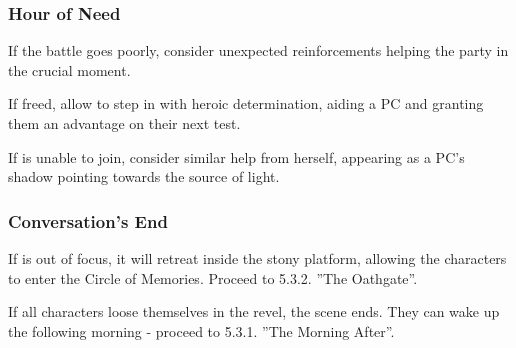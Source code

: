 \subsubsection{Hour of Need}

If the battle goes poorly, consider unexpected reinforcements helping the party in the crucial moment. 

If freed, allow \npcRevelerGeneral{} to step in with heroic determination, aiding a PC and granting them an advantage on their next test.

If \npcRevelerGeneral{} is unable to join, consider similar help from \npcSjaAnat{} herself, appearing as a PC's shadow pointing towards the source of light.




\subsubsection{Conversation's End}

If \enemyHeartOfTheRevel{} is out of focus, it will retreat inside the stony platform, allowing the characters to enter the Circle of Memories. Proceed to 5.3.2. ”The Oathgate”.

If all characters loose themselves in the revel, the scene ends. They can wake up the following morning - proceed to 5.3.1. ”The Morning After”.

